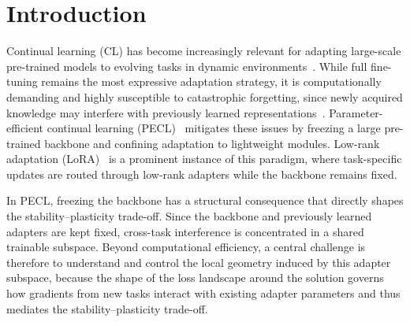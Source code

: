 \documentclass{article}
\theoremstyle{plain}
\theoremstyle{definition}
\theoremstyle{remark}
\begin{document}
\section{Introduction}

Continual learning (CL) has become increasingly relevant for adapting large-scale pre-trained models to evolving tasks in dynamic environments~\cite{PARISI201954,10444954,a2923225ea7d94e6c86faff97e23c69be,10.1145/3735633}. While full fine-tuning remains the most expressive adaptation strategy, it is computationally demanding and highly susceptible to catastrophic forgetting, since newly acquired knowledge may interfere with previously learned representations~\cite{howard2018universallanguagemodelfinetuning,doi:10.1073/pnas.1611835114,pmlr-v234-zhai24a,luo2025empiricalstudycatastrophicforgetting}. Parameter-efficient continual learning (PECL)~\cite{pmlr-v97-houlsby19a,dingParameterefficientFinetuningLargescale2023,He_2025_CVPR,NEURIPS2024_b0bc711f} mitigates these issues by freezing a large pre-trained backbone and confining adaptation to lightweight modules. Low-rank adaptation (LoRA)~\cite{hu2022lora} is a prominent instance of this paradigm, where task-specific updates are routed through low-rank adapters while the backbone remains fixed.



In PECL, freezing the backbone has a structural consequence that directly shapes the stability–plasticity trade-off. Since the backbone and previously learned adapters are kept fixed, cross-task interference is concentrated in a shared trainable subspace. Beyond computational efficiency, a central challenge is therefore to understand and control the local geometry induced by this adapter subspace,  because the shape of the loss landscape around the solution governs how gradients from new tasks interact with existing adapter parameters and thus mediates the stability–plasticity trade-off.
\end{document}

